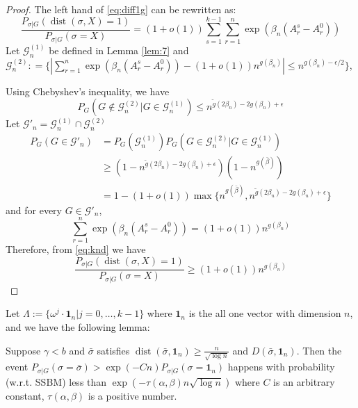 \documentclass[entropy,article,submit,moreauthors,pdftex]{Definitions/mdpi}
\newcommand{\cG}{\mathcal{G}}
\newcommand{\1}{\mathbbm{1}}
\DeclareMathOperator{\Dist}{dist}
\begin{document}
\begin{proof}
The left hand of \eqref{eq:diff1g} can be rewritten as:
\begin{equation}\label{eq:knd}
	\frac{P_{\sigma|G}(\Dist(\sigma, X)=1)}
{P_{\sigma|G}(\sigma=X)}= (1+o(1))\sum_{s=1}^{k-1}\sum_{r=1}^n \exp(\beta_n (A_r^s - A_r^0))
\end{equation}
Let $\cG^{(1)}_n$ be defined in Lemma \ref{lem:7}
and $\cG^{(2)}_n: = \{|\sum_{r=1}^n \exp(\beta_n (A_r^s - A_r^0)) - (1+o(1))n^{g(\beta_n)}  | \leq n^{g(\beta_n) - \epsilon / 2} \}$,

Using Chebyshev's inequality, we have
\begin{equation*}
P_G(G \not\in \cG^{(2)}_n \Big\vert  G \in \cG^{(1)}_n) \leq n^{\tilde{g}(2\beta_n) - 2g(\beta_n) + \epsilon}
\end{equation*}
Let $\cG'_n = \cG^{(1)}_n \cap \cG^{(2)}_n$
\begin{align*}
P_G(G \in \cG'_n) &= P_G(\cG^{(1)}_n) P_G(G \in \cG_n^{(2)} | G \in \cG_n^{(1)}) \\
& \geq (1-n^{\tilde{g}(2\beta_n) - 2g(\beta_n) + \epsilon})(1-n^{g(\bar{\beta})}) \\
&= 1-(1+o(1))\max\{n^{g(\bar{\beta})}, n^{\tilde{g}(2\beta_n) - 2g(\beta_n) + \epsilon} \}
\end{align*}
and for every $G\in\cG'_n$,
\begin{equation*}
\sum_{r=1}^n \exp(\beta_n (A_r^s - A_r^0)) = (1+o(1)) n^{g(\beta_n)}
\end{equation*}
Therefore, from \eqref{eq:knd} we have
\begin{equation*}
	\frac{P_{\sigma|G}(\Dist(\sigma, X)=1)}
{P_{\sigma|G}(\sigma=X)} \geq (1+o(1)) n^{g(\beta_n)}
\end{equation*}
\end{proof}
Let $\Lambda := \{ \omega^j  \cdot \mathbf{1}_n | j=0, \dots,k-1\}$
where $\mathbf{1}_n$ is the all one vector with dimension $n$, and we have the following lemma:
\begin{Lemma}\label{lem:small}
	Suppose $\gamma < b $ and $\bar{\sigma}$ satisfies $\Dist(\bar{\sigma}, \mathbf{1}_n) \geq \frac{n}{\sqrt{\log  n}}$
	and $D(\bar{\sigma}, \mathbf{1}_n)$.
	Then the event
	$P_{\sigma | G}(\sigma = \bar{\sigma} ) > \exp(-Cn) P_{\sigma | G}(\sigma = \mathbf{1}_n)$
	happens with probability (w.r.t. SSBM) less than $\exp(-\tau(\alpha,\beta) n \sqrt{\log  n} )$ where $C$ is an arbitrary constant, $\tau(\alpha,\beta)$ is a positive number.
\end{Lemma}
\end{document}
